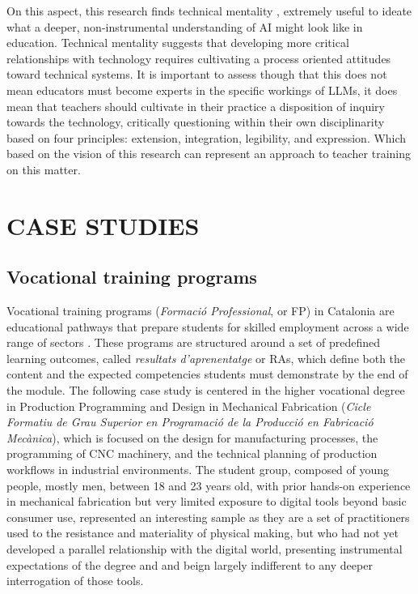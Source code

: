 \documentclass{article}
\begin{document}
On this aspect, this research finds technical mentality \cite{benabdallah2024technicalmentality}, extremely useful to ideate what a deeper, non-instrumental understanding of AI might look like in education. 
Technical mentality suggests that developing more critical relationships with technology requires cultivating a process oriented attitudes toward technical systems. It is important to assess though that this does not mean educators must become experts in the specific workings of LLMs, it does mean that teachers should cultivate in their practice a disposition of inquiry towards the technology, critically questioning within their own disciplinarity based on four principles: extension, integration, legibility, and expression. Which based on the vision of this research can represent an approach to teacher training on this matter. 



\section{CASE STUDIES}

\subsection{Vocational training programs}
Vocational training programs (\textit{Formació Professional}, or FP) in Catalonia are educational pathways that prepare students for skilled employment across a wide range of sectors \cite{gencat_fp}. These programs are structured around a set of predefined learning outcomes, called \textit{resultats d'aprenentatge} or RAs, which define both the content and the expected competencies students must demonstrate by the end of the module. The following case study is centered in the higher vocational degree in Production Programming and Design in Mechanical Fabrication (\textit{Cicle Formatiu de Grau Superior en Programació de la Producció en Fabricació Mecànica}), which is focused on the design for manufacturing processes, the programming of CNC machinery, and the technical planning of production workflows in industrial environments. The student group, composed of young people, mostly men, between 18 and 23 years old, with prior hands-on experience in mechanical fabrication but very limited exposure to digital tools beyond basic consumer use, represented an interesting sample as they are  a set of practitioners used to the resistance and materiality of physical making, but who had not yet developed a parallel relationship with the digital world, presenting instrumental expectations of the degree and and beign largely indifferent to any deeper interrogation of those tools.
\end{document}
